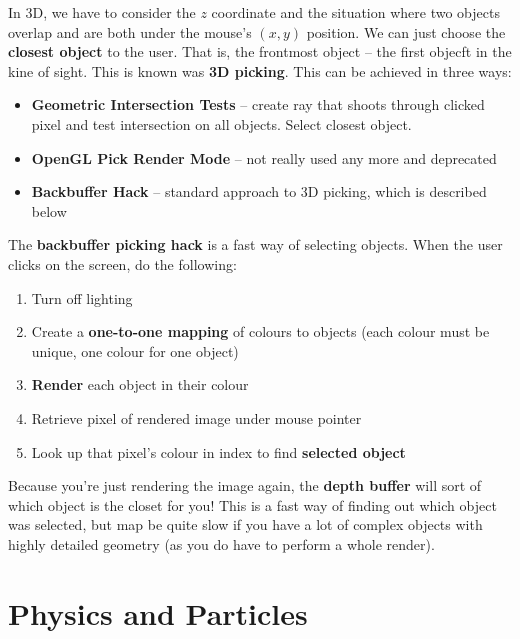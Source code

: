 \documentclass{article}
\begin{document}
In 3D, we have to consider the $z$ coordinate and the situation where two objects overlap and are both under the mouse's $(x, y)$ position. We can just choose the \textbf{closest object} to the user. That is, the frontmost object -- the first objecft in the kine of sight. This is known was \textbf{3D picking}. This can be achieved in three ways:
\begin{itemize}
	\item \textbf{Geometric Intersection Tests} -- create ray that shoots through clicked pixel and test intersection on all objects. Select closest object.
	\item \textbf{OpenGL Pick Render Mode} -- not really used any more and deprecated
	\item \textbf{Backbuffer Hack} -- standard approach to 3D picking, which is described below
\end{itemize}
The \textbf{backbuffer picking hack} is a fast way of selecting objects. When the user clicks on the screen, do the following:
\begin{enumerate}
	\item Turn off lighting
	\item Create a \textbf{one-to-one mapping} of colours to objects (each colour must be unique, one colour for one object)
	\item \textbf{Render} each object in their colour 
	\item Retrieve pixel of rendered image under mouse pointer
	\item Look up that pixel's colour in index to find \textbf{selected object}
\end{enumerate}
Because you're just rendering the image again, the \textbf{depth buffer} will sort of which object is the closet for you! This is a fast way of finding out which object was selected, but map be quite slow if you have a lot of complex objects with highly detailed geometry (as you do have to perform a whole render).

\section{Physics and Particles}
\end{document}
